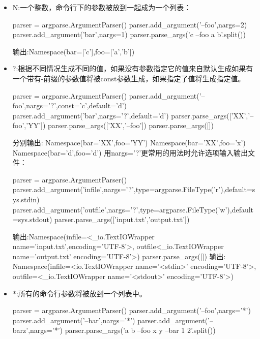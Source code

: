 \begin{itemize}
\item N:一个整数，命令行下的参数被放到一起成为一个列表：
\begin{python}
parser = argparse.ArgumentParser()
parser.add_argument('--foo',nargs=2)
parser.add_argument('bar',nargs=1)
parser.parse_args('c --foo a b'.split())
\end{python}
输出:Namespace(bar=['c'],foo=['a','b'])
\item ?:根据不同情况生成不同的值，如果没有参数指定它的值来自默认生成如果有一个带有-前缀的参数值将被const参数生成，如果指定了值将生成指定值。
\begin{python}
parser = argparse.ArgumentParser()
parser.add_argument('--foo',nargs='?',const='c',default='d')
parser.add_argument('bar',nargs='?',default='d')
parser.parse_args(['XX','--foo','YY'])
parser.parse_args(['XX','--foo'])
parser.parse_args([])
\end{python}
分别输出:\newline
Namespace(bar='XX',foo='YY')\newline
Namespace(bar='XX',foo='x')\newline
Namespace(bar='d',foo='d')\newline
用nargs='?'更常用的用法时允许选项输入输出文件：
\begin{python}
parser = argparse.ArgumentParser()
parser.add_argument('infile',nargs='?',type=argparse.FileType('r'),default=sys.stdin)
parser.add_argument('outfile',nargs='?',type=argparse.FileType('w'),default=sys.stdout)
parser.parse_args(['input.txt','output.txt'])
\end{python}
输出:Namespace(infile=<\_io.TextIOWrapper name='input.txt',encoding='UTF-8'>,
outfile<\_io.TextIOWrapper name='output.txt' encoding='UTF-8'>)
parser.parse\_args([])
输出:
Namespace(infile=<io.TextIOWrapper name='<stdin>' encoding='UTF-8'>,
outfile=<\_io.TextIOWrapper name='<stdout>' encoding='UTF-8'>)
\item *:所有的命令行参数将被放到一个列表中。
\begin{python}
parser = argparse.ArgumentParser()
parser.add_argument('--foo',nargs='*')
parser.add_argument('--bar',nargs='*')
parser.add_argument('--barz',nargs='*')
parser.parse_args('a b --foo x y --bar 1 2'.split())


\end{python}
\end{itemize}
